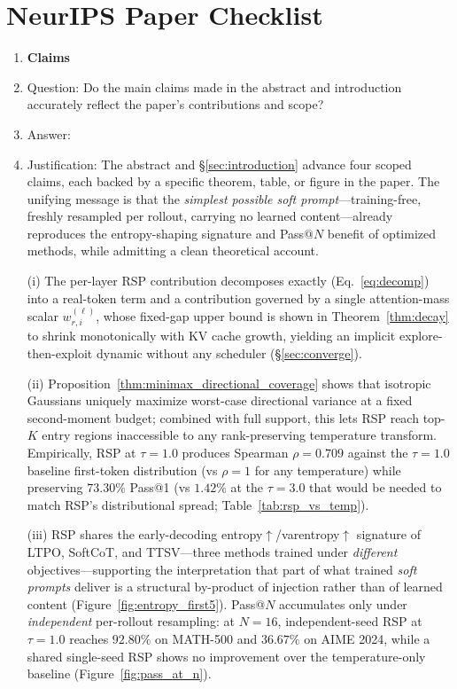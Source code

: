 \section*{NeurIPS Paper Checklist}

\begin{enumerate}

\item {\bf Claims}
    \item[] Question: Do the main claims made in the abstract and introduction accurately reflect the paper's contributions and scope?
    \item[] Answer: \answerYes{}
    \item[] Justification: The abstract and \S\ref{sec:introduction} advance four scoped claims, each backed by a specific theorem, table, or figure in the paper. The unifying message is that the \emph{simplest possible soft prompt}---training-free, freshly resampled per rollout, carrying no learned content---already reproduces the entropy-shaping signature and Pass@$N$ benefit of optimized methods, while admitting a clean theoretical account.

    (i) The per-layer RSP contribution decomposes exactly (Eq.~\eqref{eq:decomp}) into a real-token term and a contribution governed by a single attention-mass scalar $w_{r,i}^{(\ell)}$, whose fixed-gap upper bound is shown in Theorem~\ref{thm:decay} to shrink monotonically with KV cache growth, yielding an implicit explore-then-exploit dynamic without any scheduler (\S\ref{sec:converge}).

    (ii) Proposition~\ref{thm:minimax_directional_coverage} shows that isotropic Gaussians uniquely maximize worst-case directional variance at a fixed second-moment budget; combined with full support, this lets RSP reach top-$K$ entry regions inaccessible to any rank-preserving temperature transform. Empirically, RSP at $\tau=1.0$ produces Spearman $\rho=0.709$ against the $\tau=1.0$ baseline first-token distribution (vs $\rho=1$ for any temperature) while preserving $73.30\%$ Pass@1 (vs $1.42\%$ at the $\tau=3.0$ that would be needed to match RSP's distributional spread; Table~\ref{tab:rsp_vs_temp}).

    (iii) RSP shares the early-decoding entropy$\uparrow$/varentropy$\uparrow$ signature of LTPO, SoftCoT, and TTSV---three methods trained under \emph{different} objectives---supporting the interpretation that part of what trained \textit{soft prompts} deliver is a structural by-product of injection rather than of learned content (Figure~\ref{fig:entropy_first5}). Pass@$N$ accumulates only under \emph{independent} per-rollout resampling: at $N{=}16$, independent-seed RSP at $\tau{=}1.0$ reaches $92.80\%$ on MATH-500 and $36.67\%$ on AIME 2024, while a shared single-seed RSP shows no improvement over the temperature-only baseline (Figure~\ref{fig:pass_at_n}).


\end{enumerate}
